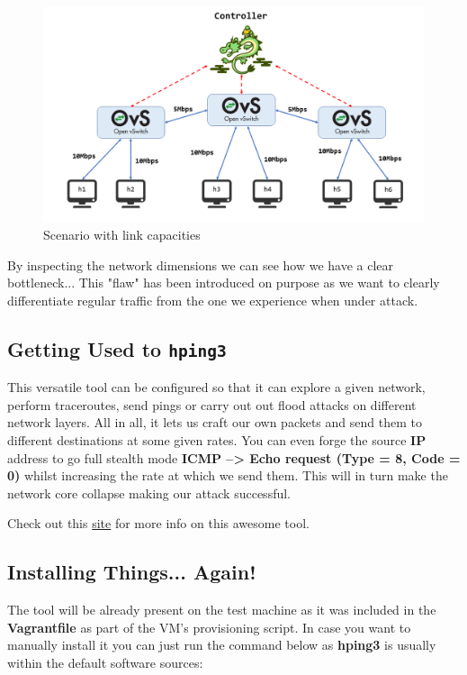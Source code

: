 \documentclass[12pt]{article}
\newcommand{\newpar} {
    \vskip 1cm
}
\begin{document}
    
			\begin{figure}[!htb]
				\centering
				\includegraphics[width=\linewidth]{scenario_limits.png}
				\caption{Scenario with link capacities}
				\label{f:limited}
			\end{figure}

			By inspecting the network dimensions we can see how we have a clear bottleneck... This "flaw" has been introduced on purpose as we want to clearly differentiate regular traffic from the one we experience when under attack.

	\subsection{Getting Used to \texttt{hping3}}
		This versatile tool can be configured so that it can explore a given network, perform traceroutes, send pings or carry out out flood attacks on different network layers. All in all, it lets us craft our own packets and send them to different destinations at some given rates. You can even forge the source \textbf{IP} address to go full stealth mode   \textbf{ICMP --> Echo request (Type = 8, Code = 0)} whilst increasing the rate at which we send them. This will in turn make the network core collapse making our attack successful.
		\newpar
		Check out this \href{https://tools.kali.org/information-gathering/hping3}{site} for more info on this awesome tool.

	\subsection{Installing Things... Again!}
		The tool will be already present on the test machine as it was included in the \textbf{Vagrantfile} as part of the VM's provisioning script. In case you want to manually install it you can just run the command below as \textbf{hping3} is usually within the default software sources:
\end{document}
